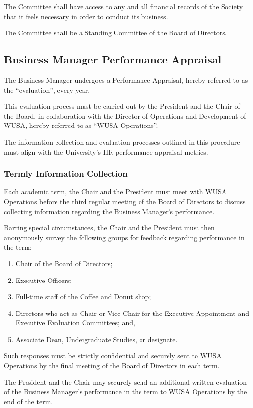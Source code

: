 The Committee shall have access to any and all financial records of the Society
that it feels necessary in order to conduct its business.

The Committee shall be a Standing Committee of the Board of Directors.

\subsection{Business Manager Performance Appraisal}
The Business Manager undergoes a Performance Appraisal, hereby referred to as the “evaluation”, every year. 

This evaluation process must be carried out by the President and the Chair of the Board, in collaboration with the Director of Operations and Development of WUSA, hereby referred to as “WUSA Operations”. 

The information collection and evaluation processes outlined in this procedure must align with the University’s HR performance appraisal metrics.

\subsubsection{Termly Information Collection}
Each academic term, the Chair and the President must meet with WUSA Operations before the third regular meeting of the Board of Directors to discuss collecting information regarding the Business Manager’s performance.

Barring special circumstances, the Chair and the President must then anonymously survey the following groups for feedback regarding performance in the term:

\begin{enumerate}
\item{Chair of the Board of Directors;}
\item{Executive Officers;}
\item{Full-time staff of the Coffee and Donut shop;}
\item{Directors who act as Chair or Vice-Chair for the Executive Appointment and Executive Evaluation Committees; and,}
\item{Associate Dean, Undergraduate Studies, or designate.}
\end{enumerate}

Such responses must be strictly confidential and securely sent to WUSA Operations by the final meeting of the Board of Directors in each term.

The President and the Chair may securely send an additional written evaluation of the Business Manager's performance in the term to WUSA Operations by the end of the term.


